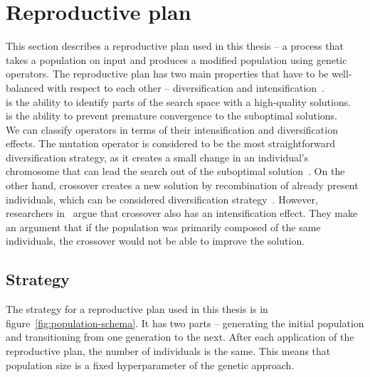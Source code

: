 \clearpage%
\newpage
\section{Reproductive plan}\label{sec:reproductive-plan}

This section describes a reproductive plan used in this thesis
– a process that takes a population on input and produces a modified population using genetic operators.
The reproductive plan has two main properties that have to be well-balanced with respect to each other
– diversification and intensification~\cite{blumMetaheuristicsCombinatorialOptimization2003}.\\

 is the ability to identify parts of the search space with a high-quality
solutions.\\

 is the ability to prevent premature convergence to the suboptimal solutions.\\

We can classify operators in terms of their intensification and diversification effects.
The mutation operator is considered to be the most straightforward diversification strategy,
as it creates a small change in an individual's chromosome that can lead the search out of the suboptimal solution~\cite{blumMetaheuristicsCombinatorialOptimization2003}.
On the other hand, crossover creates a new solution by recombination of already present
individuals, which can be considered diversification strategy~\cite{blumMetaheuristicsCombinatorialOptimization2003}.
However, researchers in~\cite{hanshengBalanceExplorationExploitation1999} argue that crossover
also has an intensification effect. They make an argument that if the population was primarily composed of the same individuals, the crossover would not be able to improve the solution.

\subsection{Strategy}\label{subsec:strategy}
The strategy for a reproductive plan used in this thesis is in figure~\ref{fig:population-schema}.
It has two parts – generating the initial population and transitioning from one generation to the next.
After each application of the reproductive plan, the number of individuals is the same.
This means that population size is a fixed hyperparameter of the genetic approach.


